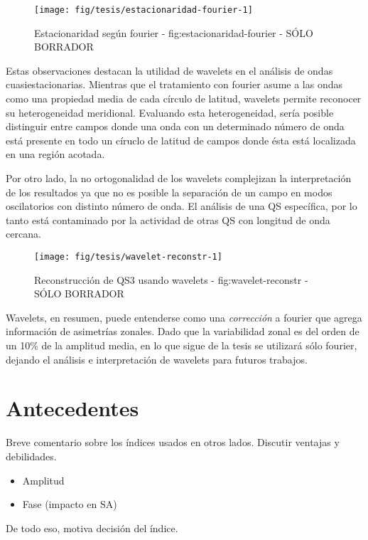 \documentclass[spanish,a4paper]{book}
\providecommand{\tightlist}{%
  \setlength{\itemsep}{0pt}\setlength{\parskip}{0pt}}
\begin{document}
\begin{figure}
\texttt{[image: fig/tesis/estacionaridad-fourier-1]} \caption{Estacionaridad según fourier - fig:estacionaridad-fourier - SÓLO BORRADOR}\label{fig:estacionaridad-fourier}
\end{figure}

Estas observaciones destacan la utilidad de wavelets en el análisis de
ondas cuasiestacionarias. Mientras que el tratamiento con fourier asume
a las ondas como una propiedad media de cada círculo de latitud,
wavelets permite reconocer su heterogeneidad meridional. Evaluando esta
heterogeneidad, sería posible distinguir entre campos donde una onda con
un determinado número de onda está presente en todo un círuclo de
latitud de campos donde ésta está localizada en una región acotada.

Por otro lado, la no ortogonalidad de los wavelets complejizan la
interpretación de los resultados ya que no es posible la separación de
un campo en modos oscilatorios con distinto número de onda. El análisis
de una QS específica, por lo tanto está contaminado por la actividad de
otras QS con longitud de onda cercana.

\begin{figure}
\texttt{[image: fig/tesis/wavelet-reconstr-1]} \caption{Reconstrucción de QS3 usando wavelets - fig:wavelet-reconstr - SÓLO BORRADOR}\label{fig:wavelet-reconstr}
\end{figure}

Wavelets, en resumen, puede entenderse como una \emph{corrección} a
fourier que agrega información de asimetrías zonales. Dado que la
variabilidad zonal es del orden de un 10\% de la amplitud media, en lo
que sigue de la tesis se utilizará sólo fourier, dejando el análisis e
interpretación de wavelets para futuros trabajos.

\section{Antecedentes}\label{antecedentes}

Breve comentario sobre los índices usados en otros lados. Discutir
ventajas y debilidades.

\begin{itemize}
\tightlist
\item
  Amplitud
\item
  Fase (impacto en SA)
\end{itemize}

De todo eso, motiva decisión del índice.
\end{document}
